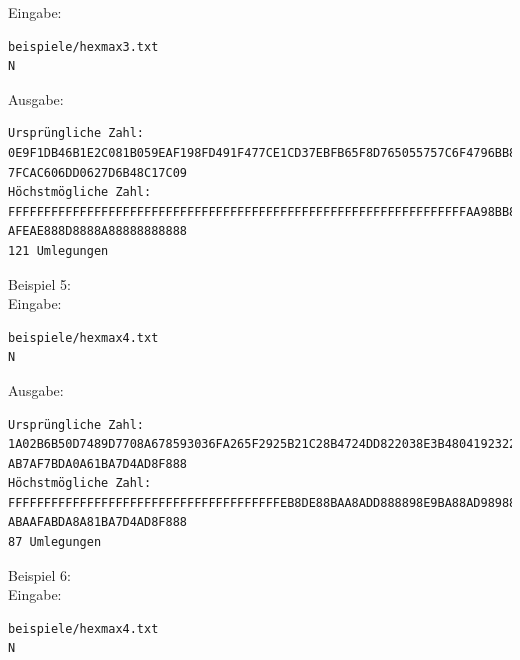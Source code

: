 \documentclass[a4paper,10pt,ngerman]{scrartcl}
\begin{document}
Eingabe: \begin{lstlisting}
beispiele/hexmax3.txt
N
\end{lstlisting}
Ausgabe: \begin{lstlisting}
Ursprüngliche Zahl:
0E9F1DB46B1E2C081B059EAF198FD491F477CE1CD37EBFB65F8D765055757C6F4796BB8B3DF
7FCAC606DD0627D6B48C17C09
Höchstmögliche Zahl:
FFFFFFFFFFFFFFFFFFFFFFFFFFFFFFFFFFFFFFFFFFFFFFFFFFFFFFFFFFFFFFFFAA98BB8B9DF
AFEAE888D8888A88888888888
121 Umlegungen
\end{lstlisting}
Beispiel 5: \\
Eingabe: \begin{lstlisting}
beispiele/hexmax4.txt
N
\end{lstlisting}
Ausgabe: \begin{lstlisting}
Ursprüngliche Zahl:
1A02B6B50D7489D7708A678593036FA265F2925B21C28B4724DD822038E3B4804192322F230
AB7AF7BDA0A61BA7D4AD8F888
Höchstmögliche Zahl:
FFFFFFFFFFFFFFFFFFFFFFFFFFFFFFFFFFFFFFEB8DE88BAA8ADD888898E9BA88AD98988F898
ABAAFABDA8A81BA7D4AD8F888
87 Umlegungen
\end{lstlisting}
Beispiel 6: \\
Eingabe: \begin{lstlisting}
beispiele/hexmax4.txt
N
\end{lstlisting}
\end{document}

